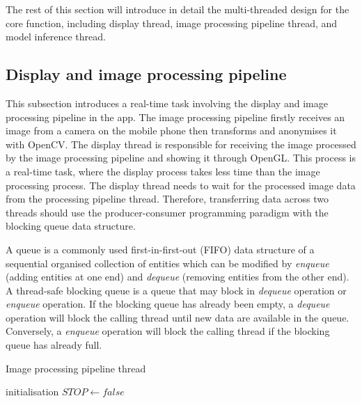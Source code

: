 The rest of this section will introduce in detail the multi-threaded design for the core function, including display thread, image processing pipeline thread, and model inference thread.

\subsection{Display and image processing pipeline}
This subsection introduces a real-time task involving the display and image processing pipeline in the app.
The image processing pipeline firstly receives an image from a camera on the mobile phone then transforms and anonymises it with OpenCV.
The display thread is responsible for receiving the image processed by the image processing pipeline and showing it through OpenGL.
This process is a real-time task, where the display process takes less time than the image processing process.
The display thread needs to wait for the processed image data from the processing pipeline thread.
Therefore, transferring data across two threads should use the producer-consumer programming paradigm with the blocking queue data structure.

A queue is a commonly used first-in-first-out (FIFO) data structure of a sequential organised collection of entities which can be modified by \textit{enqueue} (adding entities at one end) and \textit{dequeue} (removing entities from the other end).
A thread-safe blocking queue is a queue that may block in \textit{dequeue} operation or \textit{enqueue} operation.
If the blocking queue has already been empty, a \textit{dequeue} operation will block the calling thread until new data are available in the queue.
Conversely, a \textit{enqueue} operation will block the calling thread if the blocking queue has already full.

\begin{algorithm}[!ht]
\caption{Image processing pipeline thread}
\label{algo:Image processing pipeline thread}
initialisation
$STOP \gets false$\;
\end{algorithm}


